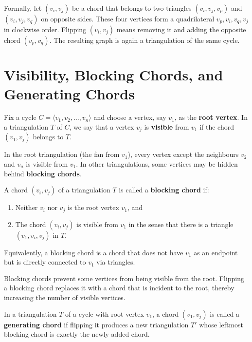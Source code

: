 Formally, let \((v_i, v_j)\) be a chord that belongs to two triangles \((v_i, v_j, v_p)\) and \((v_i, v_j, v_q)\) on opposite sides. 
These four vertices form a quadrilateral \(v_p, v_i, v_q, v_j\) in clockwise order. 
Flipping \((v_i, v_j)\) means removing it and adding the opposite chord \((v_p, v_q)\). 
The resulting graph is again a triangulation of the same cycle.

\section{Visibility, Blocking Chords, and Generating Chords}
\label{sec:visibility_blocking}

Fix a cycle \(C = \langle v_1, v_2, \ldots, v_n \rangle\) and choose a vertex, say \(v_1\), as the \textbf{root vertex}. 
In a triangulation \(T\) of \(C\), we say that a vertex \(v_j\) is \textbf{visible} from \(v_1\) if the chord \((v_1, v_j)\) belongs to \(T\).

In the root triangulation (the fan from \(v_1\)), every vertex except the neighbours \(v_2\) and \(v_n\) is visible from \(v_1\). 
In other triangulations, some vertices may be hidden behind \textbf{blocking chords}.

\begin{definition}
    \label{def:blocking_chord}
    A chord \((v_i, v_j)\) of a triangulation \(T\) is called a \textbf{blocking chord} if:
    \begin{enumerate}
        \item Neither \(v_i\) nor \(v_j\) is the root vertex \(v_1\), and
        \item The chord \((v_i, v_j)\) is visible from \(v_1\) in the sense that there is a triangle \((v_1, v_i, v_j)\) in \(T\).
    \end{enumerate}
    Equivalently, a blocking chord is a chord that does not have \(v_1\) as an endpoint but is directly connected to \(v_1\) via triangles.
\end{definition}

Blocking chords prevent some vertices from being visible from the root. 
Flipping a blocking chord replaces it with a chord that is incident to the root, thereby increasing the number of visible vertices.

\begin{definition}
    \label{def:generating_chord}
    In a triangulation \(T\) of a cycle with root vertex \(v_1\), a chord \((v_1, v_j)\) is called a \textbf{generating chord} if flipping it produces a new triangulation \(T'\) whose leftmost blocking chord is exactly the newly added chord.
\end{definition}


